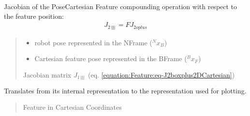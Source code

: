 \documentclass[letterpaper,10pt,english]{sphinxmanual}
\begin{document}
\begin{fulllineitems}
\begin{fulllineitems}
\end{fulllineitems}


\begin{fulllineitems}
\label{\detokenize{Feature:Feature.CartesianFeature.J_2boxplus}}
\pysigstartsignatures
{}
\pysigstopsignatures
\sphinxAtStartPar
Jacobian of the Pose\sphinxhyphen{}Cartesian Feature compounding operation with respect to the feature position:
\begin{equation}\label{equation:Feature:eq-J2boxplus2DCartesian}
\begin{split}J_{2\boxplus} = F J_{2oplus}\end{split}
\end{equation}\begin{quote}\begin{description}
\begin{itemize}
\item {} 
\sphinxAtStartPar
{} \textendash{} robot pose represented in the N\sphinxhyphen{}Frame (\(^Nx_B\))

\item {} 
\sphinxAtStartPar
{} \textendash{} Cartesian feature pose represented in the B\sphinxhyphen{}Frame (\(^Bx_F\))

\end{itemize}

\sphinxAtStartPar
Jacobian matrix \(J_{1\boxplus}\) (eq. \eqref{equation:Feature:eq-J2boxplus2DCartesian})

\end{description}\end{quote}

\end{fulllineitems}


\begin{fulllineitems}
\label{\detokenize{Feature:Feature.CartesianFeature.ToCartesian}}
\pysigstartsignatures
{}
\pysigstopsignatures
\sphinxAtStartPar
Translates from its internal representation to the representation used for plotting.
\begin{quote}\begin{description}
\sphinxAtStartPar
Feature in Cartesian Coordinates


\end{description}
\end{quote}
\end{fulllineitems}
\end{fulllineitems}
\end{document}
